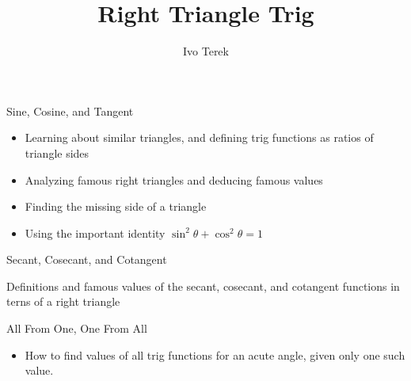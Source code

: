 \documentclass{ximera}
\author{Ivo Terek}
\title{Right Triangle Trig}
\begin{document}
\begin{abstract}
\end{abstract}
\maketitle


\begin{objectives}

\item Sine, Cosine, and Tangent
\begin{itemize}
	\item Learning about similar triangles, and defining trig functions as ratios of triangle sides
        \item Analyzing famous right triangles and deducing famous values
        \item Finding the missing side of a triangle
        \item Using the important identity $\sin^2\theta+\cos^2\theta=1$
\end{itemize}

\item Secant, Cosecant, and Cotangent
	\item Definitions and famous values of the secant, cosecant, and cotangent functions in terns of a right triangle 

\item All From One, One From All
\begin{itemize}
	\item How to find values of all trig functions for an acute angle, given only one such value.
\end{itemize}


\end{objectives}
\end{document}
